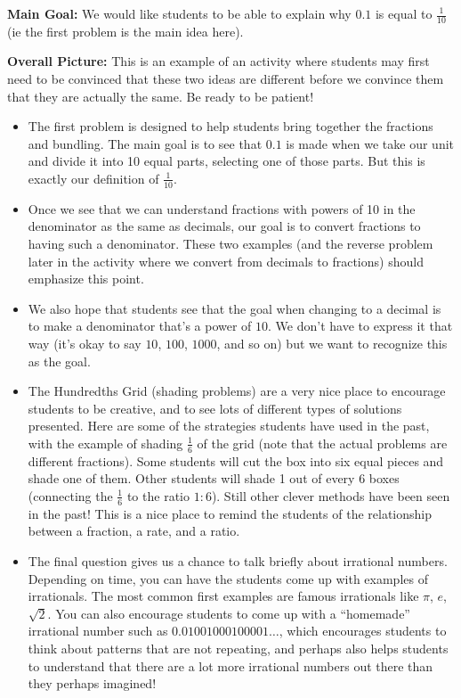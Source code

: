 \documentclass[noauthor, nooutcomes, handout]{ximera}
\begin{document}
 \newpage
\begin{instructorNotes}

{\bf Main Goal:} We would like students to be able to explain why $0.1$ is equal to $\frac{1}{10}$ (ie the first problem is the main idea here).

{\bf Overall Picture:} This is an example of an activity where students may first need to be convinced that these two ideas are different before we convince them that they are actually the same. Be ready to be patient!

 \begin{itemize}
 \item The first problem is designed to help students bring together the fractions and bundling.  The main goal is to see that $0.1$ is made when we take our unit and divide it into 10 equal parts, selecting one of those parts. But this is exactly our definition of $\frac{1}{10}$.
 \item Once we see that we can understand fractions with powers of 10 in the denominator as the same as decimals, our goal is to convert fractions to having such a denominator. These two examples (and the reverse problem later in the activity where we convert from decimals to fractions) should emphasize this point.
 
 \item We also hope that students see that the goal when changing to a decimal is to make a denominator that's a power of $10$. We don't have to express it that way (it's okay to say $10$, $100$, $1000$, and so on) but we want to recognize this as the goal.
  
  \item The Hundredths Grid (shading problems) are a very nice place to encourage students to be creative, and to see lots of different types of solutions presented. Here are some of the strategies students have used in the past, with the example of shading $\frac16$ of the grid (note that the actual problems are different fractions). Some students will cut the box into six equal pieces and shade one of them. Other students will shade 1 out of every 6 boxes (connecting the $\frac{1}{6}$ to the ratio $1:6$). Still other clever methods have been seen in the past! This is a nice place to remind the students of the relationship between a fraction, a rate, and a ratio.


\item The final question gives us a chance to talk briefly about irrational numbers. Depending on time, you can have the students come up with examples of irrationals. The most common first examples are famous irrationals like $\pi$, $e$, $\sqrt{2}$. You can also encourage students to come up with a ``homemade'' irrational number such as $0.01001000100001\dots$, which encourages students to think about patterns that are not repeating, and perhaps also helps students to understand that there are a lot more irrational numbers out there than they perhaps imagined! 



\end{itemize}
\end{instructorNotes}
\end{document}
